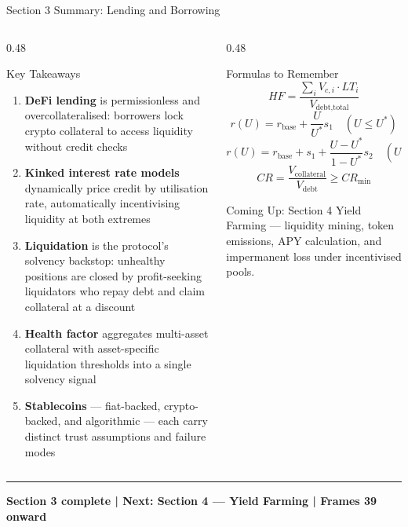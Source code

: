 \documentclass[8pt,aspectratio=169]{beamer}
\newcommand{\bottomnote}[1]{\vfill\vspace{-2mm}\textcolor{mllavender2}{\rule{\textwidth}{0.4pt}}\vspace{1mm}\footnotesize\textbf{#1}}
\begin{document}
\begin{frame}{Section 3 Summary: Lending and Borrowing}
  \begin{columns}[T]
    \begin{column}{0.48\textwidth}
      \begin{block}{Key Takeaways}
        \begin{enumerate}\setlength\itemsep{4pt}
          \item \textbf{DeFi lending} is permissionless and overcollateralised: borrowers lock
                crypto collateral to access liquidity without credit checks
          \item \textbf{Kinked interest rate models} dynamically price credit by utilisation rate,
                automatically incentivising liquidity at both extremes
          \item \textbf{Liquidation} is the protocol's solvency backstop: unhealthy positions are
                closed by profit-seeking liquidators who repay debt and claim collateral at a discount
          \item \textbf{Health factor} aggregates multi-asset collateral with asset-specific
                liquidation thresholds into a single solvency signal
          \item \textbf{Stablecoins} --- fiat-backed, crypto-backed, and algorithmic --- each carry
                distinct trust assumptions and failure modes
        \end{enumerate}
      \end{block}
    \end{column}
    \begin{column}{0.48\textwidth}
      \begin{block}{Formulas to Remember}
        \[
          HF = \frac{\sum_i V_{c,i} \cdot LT_i}{V_{\text{debt,total}}}
        \]
        \[
          r(U) = r_{\text{base}} + \frac{U}{U^*} s_1 \quad (U \leq U^*)
        \]
        \[
          r(U) = r_{\text{base}} + s_1 + \frac{U - U^*}{1 - U^*} s_2 \quad (U > U^*)
        \]
        \[
          CR = \frac{V_{\text{collateral}}}{V_{\text{debt}}} \geq CR_{\min}
        \]
      \end{block}
      \vspace{3mm}
      \begin{alertblock}{Coming Up: Section 4}
        Yield Farming --- liquidity mining, token emissions, APY calculation, and impermanent loss
        under incentivised pools.
      \end{alertblock}
    \end{column}
  \end{columns}
  \bottomnote{Section 3 complete | Next: Section 4 --- Yield Farming | Frames 39 onward}
\end{frame}
\end{document}
